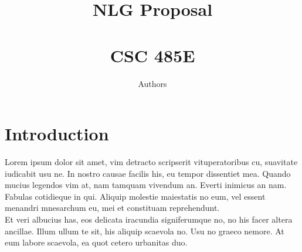 \documentclass[12pt]{article}
\begin{document}
\title{NLG Proposal\\ \hrulefill \\
	CSC 485E}
\author{Authors}


\maketitle



\section{Introduction}
Lorem ipsum dolor sit amet, vim detracto scripserit vituperatoribus cu, suavitate iudicabit usu ne. In nostro causae facilis his, eu tempor dissentiet mea\cite{winkler1984venn}. Quando mucius legendos vim at, nam tamquam vivendum an. Everti inimicus an nam. Fabulas cotidieque in qui. Aliquip molestie maiestatis no eum, vel essent menandri mnesarchum eu, mei et constituam reprehendunt. \\

Et veri albucius has, eos delicata iracundia signiferumque no, no his facer altera ancillae\cite{ruskey1997survey}. Illum ullum te sit, his aliquip scaevola no. Usu no graeco nemore. At eum labore scaevola, ea quot cetero urbanitas duo\cite{bultena2013face}.

 


\end{document}
